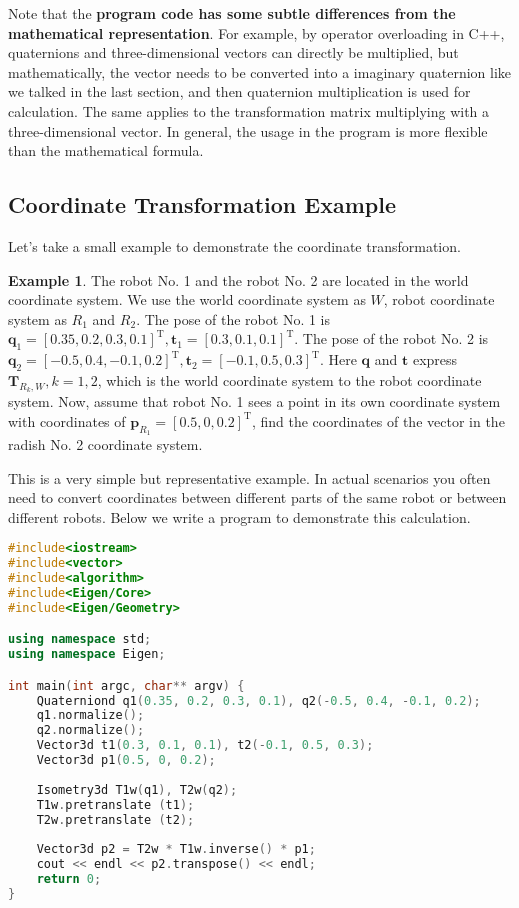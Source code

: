 Note that the \textbf {program code has some subtle differences from the mathematical representation}. For example, by operator overloading in C++, quaternions and three-dimensional vectors can directly be multiplied, but mathematically, the vector needs to be converted into a imaginary quaternion like we talked in the last section, and then quaternion multiplication is used for calculation. The same applies to the transformation matrix multiplying with a three-dimensional vector. In general, the usage in the program is more flexible than the mathematical formula.

\subsection{Coordinate Transformation Example}

Let's take a small example to demonstrate the coordinate transformation.

\noindent  \textbf{Example 1}. \quad  The robot No. 1 and the robot No. 2 are located in the world coordinate system. We use the world coordinate system as $W$, robot coordinate system as $R_1 $ and $R_2$. The pose of the robot No. 1 is $ \mathbf {q}_ 1 = [ 0.35, 0.2, 0.3, 0.1 ]^ \mathrm{T}, \mathbf{t}_ 1 = [ 0.3, 0.1, 0.1 ]^ \mathrm{T} $. The pose of the robot No. 2 is $ \mathbf{q}_2 = [ - 0.5, 0.4, - 0.1, 0.2 ]^ \mathrm{T}, \mathbf{t}_ 2 = [- 0.1, 0.5, 0.3 ]^ \mathrm{T} $. Here $ \mathbf {q} $ and $ \mathbf{t} $ express $ \mathbf{T}_{R_k, W}, k= 1, 2 $, which is the world coordinate system to the robot coordinate system. Now, assume that robot No. 1 sees a point in its own coordinate system with coordinates of $ \mathbf{p}_{R_1} = [ 0.5, 0, 0.2 ]^ \mathrm{T} $, find the coordinates of the vector in the radish No. 2 coordinate system.

This is a very simple but representative example. In actual scenarios you often need to convert coordinates between different parts of the same robot or between different robots. Below we write a program to demonstrate this calculation.

\begin{lstlisting}[language=c++,caption=slambook2/ch3/examples/coordinateTransform.cpp]
#include<iostream>
#include<vector>
#include<algorithm>
#include<Eigen/Core>
#include<Eigen/Geometry>

using namespace std;
using namespace Eigen;

int main(int argc, char** argv) {
	Quaterniond q1(0.35, 0.2, 0.3, 0.1), q2(-0.5, 0.4, -0.1, 0.2);
	q1.normalize();
	q2.normalize();
	Vector3d t1(0.3, 0.1, 0.1), t2(-0.1, 0.5, 0.3);
	Vector3d p1(0.5, 0, 0.2);
	
	Isometry3d T1w(q1), T2w(q2);
	T1w.pretranslate (t1);
	T2w.pretranslate (t2);
	
	Vector3d p2 = T2w * T1w.inverse() * p1;
	cout << endl << p2.transpose() << endl;
	return 0;
}
\end{lstlisting}

